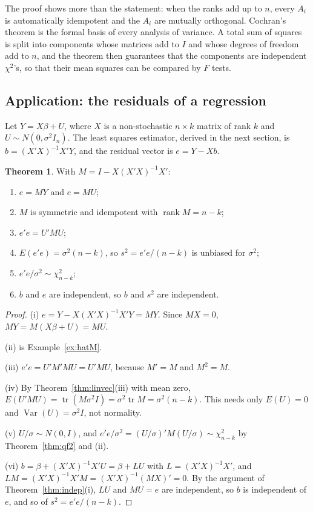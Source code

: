 \documentclass[11pt,a4paper]{article}
\numberwithin{equation}{section}
\DeclareMathOperator{\Var}{Var}
\DeclareMathOperator{\tr}{tr}
\DeclareMathOperator{\rank}{rank}
\theoremstyle{definition}
\newtheorem{thm}{Theorem}[subsection]
\begin{document}
The proof shows more than the statement: when the ranks add up to $n$, every $A_i$ is automatically idempotent and the $A_i$ are mutually
orthogonal. Cochran's theorem is the formal basis of every analysis of variance. A total sum of squares is split into components whose matrices
add to $I$ and whose degrees of freedom add to $n$, and the theorem then guarantees that the components are independent $\chi^2$'s, so that their
mean squares can be compared by $F$ tests.

\subsection{Application: the residuals of a regression}
\label{ssec:residqf}

Let $Y = X\beta + U$, where $X$ is a non-stochastic $n \times k$ matrix of rank $k$ and $U \sim N(0, \sigma^2I_n)$. The least squares estimator,
derived in the next section, is $b = (X'X)^{-1}X'Y$, and the residual vector is $e = Y - Xb$.

\begin{thm}
\label{thm:residqf}
With $M = I - X(X'X)^{-1}X'$:
\begin{enumerate}[label=(\roman*)]
\item $e = MY$ and $e = MU$;
\item $M$ is symmetric and idempotent with $\rank M = n - k$;
\item $e'e = U'MU$;
\item $E(e'e) = \sigma^2(n - k)$, so $s^2 = e'e/(n - k)$ is unbiased for $\sigma^2$;
\item $e'e/\sigma^2 \sim \chi^2_{n-k}$;
\item $b$ and $e$ are independent, so $b$ and $s^2$ are independent.
\end{enumerate}
\end{thm}

\begin{proof}
(i) $e = Y - X(X'X)^{-1}X'Y = MY$. Since $MX = 0$, $MY = M(X\beta + U) = MU$.

(ii) is Example~\ref{ex:hatM}.

(iii) $e'e = U'M'MU = U'MU$, because $M' = M$ and $M^2 = M$.

(iv) By Theorem~\ref{thm:linvec}(iii) with mean zero, $E(U'MU) = \tr(M\sigma^2I) = \sigma^2\tr M = \sigma^2(n - k)$. This needs only $E(U) = 0$ and
$\Var(U) = \sigma^2I$, not normality.

(v) $U/\sigma \sim N(0, I)$, and $e'e/\sigma^2 = (U/\sigma)'M(U/\sigma) \sim \chi^2_{n-k}$ by Theorem~\ref{thm:qf2} and (ii).

(vi) $b = \beta + (X'X)^{-1}X'U = \beta + LU$ with $L = (X'X)^{-1}X'$, and $LM = (X'X)^{-1}X'M = (X'X)^{-1}(MX)' = 0$. By the argument of
Theorem~\ref{thm:indep}(i), $LU$ and $MU = e$ are independent, so $b$ is independent of $e$, and so of $s^2 = e'e/(n - k)$.
\end{proof}
\end{document}
